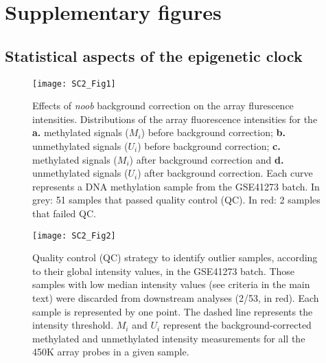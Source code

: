 
\setcounter{chapter}{-1}

\chapter[]{Supplementary figures} 

\ifpdf
\graphicspath{{Appendix/Figs/pdf/}}
\else
\graphicspath{{Appendix/Figs/svg/}}
\fi

\renewcommand{\thesection}{S.1}   
\section{Statistical aspects of the epigenetic clock}

\renewcommand\thefigure{S1.\arabic{figure}}    

\begin{figure}[htbp!] 
	\centering    
	\setcounter{figure}{0}
	\texttt{[image: SC2\_Fig1]}
	\caption[Effects of \textit{noob} background correction on the array fluorescence intensities.]{Effects of \textit{noob} background correction on the array flurescence intensities. Distributions of the array fluorescence intensities for the \textbf{a.} methylated signals ($M_{i}$) before background correction; \textbf{b.} unmethylated signals ($U_{i}$) before background correction; \textbf{c.} methylated signals ($M_{i}$) after background correction and \textbf{d.} unmethylated signals ($U_{i}$) after background correction. Each curve represents a DNA methylation sample from the GSE41273 batch. In grey: 51 samples that passed quality control (QC). In red: 2 samples that failed QC.}
	\label{fig:sc2_fig1}
\end{figure}

\begin{figure}[htbp!] 
	\centering    
	\texttt{[image: SC2\_Fig2]}
	\caption[Quality control (QC) strategy to identify outlier samples.]{Quality control (QC) strategy to identify outlier samples, according to their global intensity values, in the GSE41273 batch. Those samples with low median intensity values (see criteria in the main text) were discarded from downstream analyses (2/53, in red). Each sample is represented by one point. The dashed line represents the  intensity threshold. $M_{i}$ and $U_{i}$ represent the background-corrected methylated and unmethylated intensity measurements for all the 450K array probes in a given sample.}
	\label{fig:sc2_fig2}
\end{figure}

